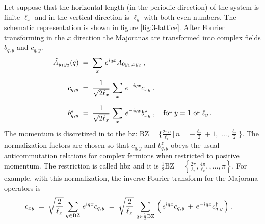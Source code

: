 Let suppose that the horizontal length (in the periodic direction) of the system is finite $\ell_x$ and in the vertical direction is $\ell_y$ with both even numbers.  The schematic representation is shown in  figure \ref{fig:3-lattice}.  After Fourier transforming in the $x$ direction the Majoranas are transformed into complex fields $b_{q , y}$ and $c_{q,y}$. %
\begin{align}
     \tilde{A}_{y_1y_2}(q)  \; &= \;  \sum_{x} \, e^{\dot{\imath} qx} A_{0y_1,xy_2} \; \label{eq:3-fourier-t} , \\[6pt]
    c_{q,y} \; &= \; \frac{1}{\sqrt{2\ell_x}} \, \sum_{x} \, e^{- \dot{\imath} q x} c_{xy} \; ,  \label{eq:3-fourier-t-c}  \\[6pt]
    b^{z}_{q,y} \; &= \; \frac{1}{\sqrt{2\ell_x}} \, \sum_{x} \, e^{- \dot{\imath} q x} b^{z}_{xy} \; , \quad \text{for } y = 1 \text{ or } \ell_{y} \, .
\end{align}
The momentum is discretized in to the \acrlong{bz}: $\text{BZ}= \big\{  \frac{2\pi n}{\ell_x} \, \Big\vert \,  n = -\frac{\ell_x}{2}+1 , $ $...,\frac{\ell_x}{2} \big\}$. The normalization factors are chosen so that $c_{q,y}$ and $ b^{z}_{q,y}$ obeys the usual anticommutation relations for complex fermions when restricted to positive momentum. The restriction is called \acrfull{hbz} and it is $\frac{1}{2}\text{BZ}= \left\{  \frac{2\pi}{\ell_x}, \frac{4\pi}{\ell_x}, ,...,\pi  \right\}$. For example, with this normalization, the inverse Fourier transform for the Majorana operators is
\begin{align}
    c_{xy} \; &= \; \sqrt{\frac{2}{\ell_x}} \, \sum_{q \in \text{BZ}} \, e^{\dot{\imath} q x} c_{q,y}  \; = \;  \sqrt{\frac{2}{\ell_x}} \, \sum_{q \in \frac{1}{2}\text{BZ}} \, \Big( \,e^{\dot{\imath} q x} c_{q,y} \, + \, e^{-\dot{\imath} q x} c_{q,y}^{\dagger} \, \Big)\; . \label{eq:3-inverse-fourier}
\end{align}


